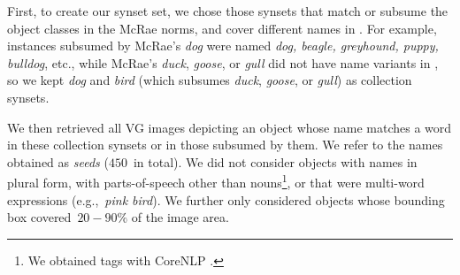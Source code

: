 First, to create our synset set, we chose those \vg synsets that match or subsume the object classes in the McRae norms, and cover different names in \vg.
For example, \vg instances subsumed by McRae's \textsl{dog} were named \textsl{dog, beagle, greyhound, puppy, bulldog}, etc., while McRae's \textsl{duck}, \textsl{goose}, or \textsl{gull} did not have name variants in \vg, so we kept \textsl{dog} and \textsl{bird} (which subsumes \textsl{duck}, \textsl{goose}, or \textsl{gull}) as collection synsets.

We then retrieved all VG images depicting an object whose name matches a word in these collection synsets or in those subsumed by them. We refer to the names obtained as \textit{seeds} ($450$\ in total).
We did not consider objects with names in plural form, with parts-of-speech other than nouns\footnote{We obtained tags with CoreNLP \cite{manning2014stanford}.}, or that were multi-word expressions (e.g.,~\textsl{pink bird}). 
We further only considered objects whose bounding box covered~\mbox{$20-90\%$} of the image area.
